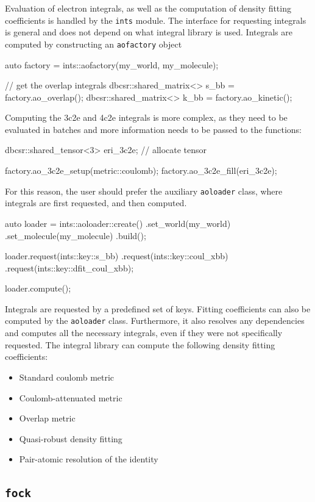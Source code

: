 Evaluation of electron integrals, as well as the computation of density fitting coefficients is handled by the \texttt{ints} module. The interface for requesting integrals is general and does not depend on what integral library is used. Integrals are computed by constructing an \texttt{aofactory} object
\begin{cppinline}
auto factory = ints::aofactory(my_world, my_molecule);

// get the overlap integrals
dbcsr::shared_matrix<> s_bb = factory.ao_overlap();
dbcsr::shared_matrix<> k_bb = factory.ao_kinetic();
\end{cppinline}
\noindent Computing the 3c2e and 4c2e integrals is more complex, as they need to be evaluated in batches and more information needs to be passed to the functions:
\begin{cppinline}
dbcsr::shared_tensor<3> eri_3c2e;
// allocate tensor

factory.ao_3c2e_setup(metric::coulomb);
factory.ao_3c2e_fill(eri_3c2e);
\end{cppinline}
\noindent For this reason, the user should prefer the auxiliary  \texttt{aoloader} class, where integrals are first requested, and then computed.
\begin{cppinline}
auto loader = ints::aoloader::create()
	.set_world(my_world)
	.set_molecule(my_molecule)
	.build();
	
loader.request(ints::key::s_bb)
	.request(ints::key::coul_xbb)
	.request(ints::key::dfit_coul_xbb);
	
loader.compute();
\end{cppinline}
\noindent Integrals are requested by a predefined set of keys. Fitting coefficients can also be computed by the \texttt{aoloader} class. Furthermore, it also resolves any dependencies and computes all the necessary integrals, even if they were not specifically requested. The integral library can compute the following density fitting coefficients:
\begin{itemize}
\item Standard coulomb metric
\item Coulomb-attenuated metric
\item Overlap metric
\item Quasi-robust density fitting
\item Pair-atomic resolution of the identity
\end{itemize}

\subsection{\texttt{fock}}

